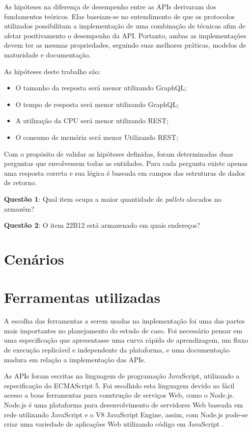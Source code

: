 As hipóteses na diferença de desempenho entre as APIs derivaram dos fundamentos teóricos. Elas baseiam-se no entendimento de que os protocolos utilizados possibilitam a implementação de uma combinação de técnicas afim de afetar positivamento o desempenho da API. Portanto, ambas as implementações devem ter as mesmas propriedades, seguindo suas melhores práticas, modelos de maturidade e documentação.

As hipóteses deste trabalho são: 

\begin{itemize}
\item O tamanho da resposta será menor utilizando GraphQL;
\item O tempo de resposta será menor utilizando GraphQL;
\item A utilização da CPU será menor utilizando REST;
\item O consumo de memória será menor Utilizando REST;
\end{itemize}

Com o propósito de validar as hipóteses definidas, foram determinadas duas perguntas que envolvessem todas as entidades. Para cada pergunta existe apenas uma resposta correta e sua lógica é baseada em campos das estruturas de dados de retorno.

\textbf{Questão 1}: Qual item ocupa a maior quantidade de \textit{pallets} alocados no armazém?

\textbf{Questão 2}: O item 22B12 está armazenado em quais endereços?

\section{Cenários} \label{sec:cenarios}

\section{Ferramentas utilizadas} \label{sec:cenarios}

A escolha das ferramentas a serem usadas na implementação foi uma das partes mais importantes no planejamento do estudo de caso. Foi necessário pensar em uma especificação que apresentasse uma curva rápida de aprendizagem, um fluxo de execução replicável e independente da plataforma, e uma documentação madura em relação a implementação das APIs.

As APIs foram escritas na linguagem de programação JavaScript, utilizando a especificação do ECMAScript 5. Foi escolhido esta linguagem devido ao fácil acesso a boas ferramentas para construção de serviços Web, como o Node.js. Node.js é uma plataforma para desenvolvimento de servidores Web baseada em rede utilizando JavaScript e o V8 JavaScript Engine, assim, com Node.js pode-se criar uma variedade de aplicações Web utilizando código em JavaScript \cite{node-definition}.

